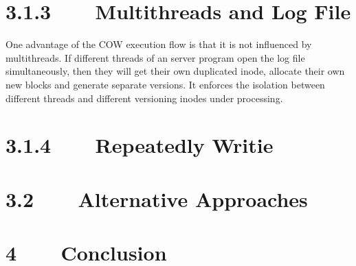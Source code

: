\section*{3.1.3~~~~Multithreads and Log File}
One advantage of the COW execution flow is that it is not influenced by multithreads. If different threads of an server program open the log file simultaneously, then they will get their own duplicated inode, allocate their own new blocks and generate separate versions. It enforces the isolation between different threads and different versioning inodes under processing.
\section*{3.1.4~~~~Repeatedly Writie}
\section*{3.2~~~~Alternative Approaches}
\section*{4~~~~Conclusion}
